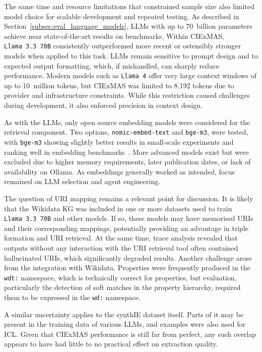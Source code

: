 \documentclass[a4paper,oneside,bibliography=totoc]{scrbook}
\begin{document}
The same time and resource limitations that constrained sample size also limited model choice for scalable development and repeated testing. As described in Section~\ref{subsec:eval_language_models}, \acp{LLM} with up to 70~billion parameters achieve near state-of-the-art results on benchmarks. Within CIExMAS, \texttt{Llama~3.3~70B} consistently outperformed more recent or ostensibly stronger models when applied to this task. \acp{LLM} remain sensitive to prompt design and to expected output formatting, which, if mishandled, can sharply reduce performance. Modern models such as \texttt{Llama~4} offer very large context windows of up to 10~million tokens, but CIExMAS was limited to 8{,}192 tokens due to provider and infrastructure constraints. While this restriction caused challenges during development, it also enforced precision in context design.

As with the \acp{LLM}, only open source embedding models were considered for the retrieval component. Two options, \texttt{nomic-embed-text} and \texttt{bge-m3}, were tested, with \texttt{bge-m3} showing slightly better results in small-scale experiments and ranking well in embedding benchmarks~\cite{Muennighoff2023}. More advanced models exist but were excluded due to higher memory requirements, later publication dates, or lack of availability on Ollama. As embeddings generally worked as intended, focus remained on \ac{LLM} selection and agent engineering.

The question of \ac{URI} mapping remains a relevant point for discussion. It is likely that the Wikidata \ac{KG} was included in one or more datasets used to train \texttt{Llama~3.3~70B} and other models. If so, these models may have memorised \acp{URI} and their corresponding mappings, potentially providing an advantage in triple formation and \ac{URI} retrieval. At the same time, trace analysis revealed that outputs without any interaction with the \ac{URI} retrieval tool often contained hallucinated \acp{URI}, which significantly degraded results. Another challenge arose from the integration with Wikidata. Properties were frequently produced in the \texttt{wdt:} namespace, which is technically correct for properties, but evaluation, particularly the detection of soft matches in the property hierarchy, required them to be expressed in the \texttt{wd:} namespace.

A similar uncertainty applies to the synthIE dataset itself. Parts of it may be present in the training data of various \acp{LLM}, and examples were also used for \ac{ICL}. Given that CIExMAS performance is still far from perfect, any such overlap appears to have had little to no practical effect on extraction quality.
\end{document}
